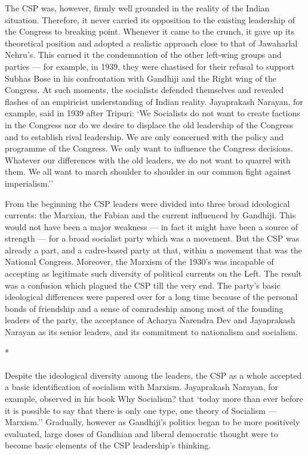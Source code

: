 \begin{multicols}{2}
The CSP was, however, firmly well grounded in the reality of the Indian situation. Therefore, it never carried its opposition to the existing leadership of the Congress to breaking point. Whenever it came to the crunch, it gave up its theoretical position and adopted a realistic approach close to that of Jawaharlal Nehru's. This earned it the condemnation of the other left-wing groups and parties --- for example, in 1939, they were chastised for their refusal to support Subhas Bose in his confrontation with Gandhiji and the Right wing of the Congress. At such moments, the socialists defended themselves and revealed flashes of an empiricist understanding of Indian reality. Jayaprakash Narayan, for example, said in 1939 after Tripuri: `We Socialists do not want to create factions in the Congress nor do we desire to displace the old leadership of the Congress and to establish rival leadership. We are only concerned with the policy and programme of the Congress. We only want to influence the Congress decisions. Whatever our differences with the old leaders, we do not want to quarrel with them. We all want to march shoulder to shoulder in our common fight against imperialism.'' 

From the beginning the CSP leaders were divided into three broad ideological currents: the Marxian, the Fabian and the current influenced by Gandhiji. This would not have been a major weakness --- in fact it might have been a source of strength --- for a broad socialist party which was a movement. But the CSP was already a part, and a cadre-based party at that, within a movement that was the National Congress. Moreover, the Marxism of the 1930's was incapable of accepting as legitimate such diversity of political currents on the Left. The result was a confusion which plagued the CSP till the very end. The party's basic ideological differences were papered over for a long time because of the personal bonds of friendship and a sense of comradeship among most of the founding leaders of the party, the acceptance of Acharya Narendra Dev and Jayaprakash Narayan as its senior leaders, and its commitment to nationalism and socialism.

\begin{center}*\end{center}

\paragraph*{}

Despite the ideological diversity among the leaders, the CSP as a whole accepted a basic identification of socialism with Marxism. Jayaprakash Narayan, for example, observed in his book Why Socialism? that `today more than ever before it is possible to say that there is only one type, one theory of Socialism --- Marxism.'' Gradually, however as Gandhiji's politics began to be more positively evaluated, large doses of Gandhian and liberal democratic thought were to become basic elements of the CSP leadership's thinking. 


\end{multicols}
